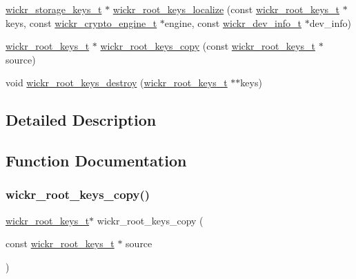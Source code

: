 \begin{DoxyCompactItemize}
\mbox{\hyperlink{structwickr__storage__keys}{wickr\+\_\+storage\+\_\+keys\+\_\+t}} $\ast$ \mbox{\hyperlink{group__wickr__root__keys_gaa34dd6c85c667b8b7fb025f56c7bcc46}{wickr\+\_\+root\+\_\+keys\+\_\+localize}} (const \mbox{\hyperlink{structwickr__root__keys}{wickr\+\_\+root\+\_\+keys\+\_\+t}} $\ast$keys, const \mbox{\hyperlink{structwickr__crypto__engine}{wickr\+\_\+crypto\+\_\+engine\+\_\+t}} $\ast$engine, const \mbox{\hyperlink{structwickr__dev__info}{wickr\+\_\+dev\+\_\+info\+\_\+t}} $\ast$dev\+\_\+info)
\item 
\mbox{\hyperlink{structwickr__root__keys}{wickr\+\_\+root\+\_\+keys\+\_\+t}} $\ast$ \mbox{\hyperlink{group__wickr__root__keys_gadda1b8fd1b5cc1cf6b7b2b0e72912858}{wickr\+\_\+root\+\_\+keys\+\_\+copy}} (const \mbox{\hyperlink{structwickr__root__keys}{wickr\+\_\+root\+\_\+keys\+\_\+t}} $\ast$source)
\item 
void \mbox{\hyperlink{group__wickr__root__keys_gacabc33b7c56cbc84a5085d0a4330694f}{wickr\+\_\+root\+\_\+keys\+\_\+destroy}} (\mbox{\hyperlink{structwickr__root__keys}{wickr\+\_\+root\+\_\+keys\+\_\+t}} $\ast$$\ast$keys)
\end{DoxyCompactItemize}


\subsection{Detailed Description}


\subsection{Function Documentation}
\mbox{\label{group__wickr__root__keys_gadda1b8fd1b5cc1cf6b7b2b0e72912858}} 
\subsubsection{\texorpdfstring{wickr\_root\_keys\_copy()}{wickr\_root\_keys\_copy()}}
{\footnotesize\ttfamily \mbox{\hyperlink{structwickr__root__keys}{wickr\+\_\+root\+\_\+keys\+\_\+t}}$\ast$ wickr\+\_\+root\+\_\+keys\+\_\+copy (\begin{DoxyParamCaption}\item[{const \mbox{\hyperlink{structwickr__root__keys}{wickr\+\_\+root\+\_\+keys\+\_\+t}} $\ast$}]{source }\end{DoxyParamCaption})}

